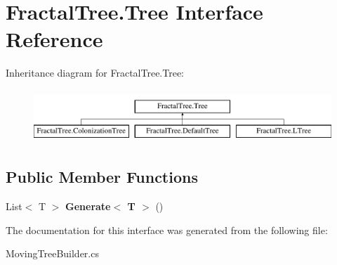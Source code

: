 \hypertarget{interface_fractal_tree_1_1_tree}{}\section{Fractal\+Tree.\+Tree Interface Reference}
\label{interface_fractal_tree_1_1_tree}
Inheritance diagram for Fractal\+Tree.\+Tree\+:\begin{figure}[H]
\begin{center}
\leavevmode
\includegraphics[height=2.000000cm]{interface_fractal_tree_1_1_tree}
\end{center}
\end{figure}
\subsection*{Public Member Functions}
\begin{DoxyCompactItemize}
\item 
\hypertarget{interface_fractal_tree_1_1_tree_a63c5353759447db5034d7ee1c83fbd78}{}\label{interface_fractal_tree_1_1_tree_a63c5353759447db5034d7ee1c83fbd78} 
List$<$ T $>$ {\bfseries Generate$<$ T $>$} ()
\end{DoxyCompactItemize}


The documentation for this interface was generated from the following file\+:\begin{DoxyCompactItemize}
\item 
Moving\+Tree\+Builder.\+cs\end{DoxyCompactItemize}
